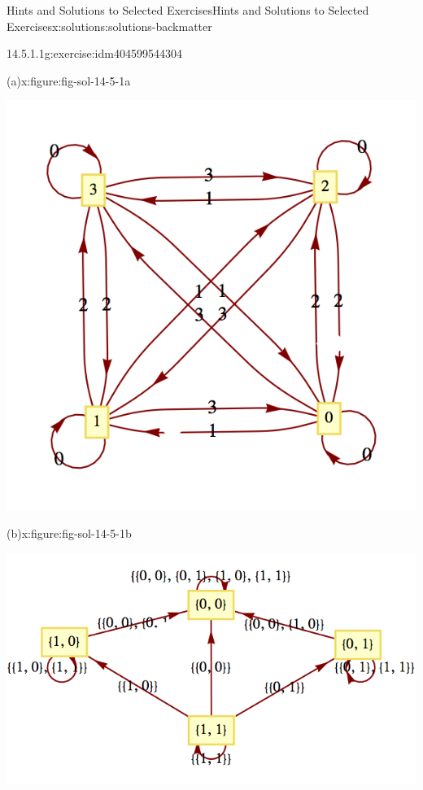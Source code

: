 \documentclass[twoside,10pt,]{book}
\numberwithin{equation}{section}
\begin{document}
\begin{solutions-chapter}{Hints and Solutions to Selected Exercises}{}{Hints and Solutions to Selected Exercises}{}{}{x:solutions:solutions-backmatter}
\begin{divisionsolution}{14.5.1.1}{}{g:exercise:idm404599544304}
\begin{figureptx}{(a)}{x:figure:fig-sol-14-5-1a}{}
\begin{image}{0.15}{0.7}{0.15}%
\includegraphics[width=\linewidth]{images/fig-sol-14-5-1a.png}
\end{image}%
\tcblower
\end{figureptx}%
\begin{figureptx}{(b)}{x:figure:fig-sol-14-5-1b}{}%
\begin{image}{0.15}{0.7}{0.15}%
\includegraphics[width=\linewidth]{images/fig-sol-14-5-1b.png}
\end{image}%
\tcblower
\end{figureptx}%
\end{divisionsolution}%

\end{solutions-chapter}
\end{document}
